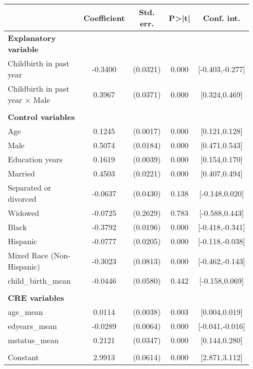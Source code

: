 {
\def\sym#1{\ifmmode^{#1}\else\(^{#1}\)\fi}
\begin{tabular}{l*{1}{cccc}}
\toprule
                    & Coefficient&   Std. err.&       P>|t|&  Conf. int.\\
\midrule
\textbf{Explanatory variable}&            &            &            &            \\
Childbirth in past year&     -0.3400&    (0.0321)&       0.000&[-0.403,-0.277]\\
Childbirth in past year $\times$ Male&      0.3967&    (0.0371)&       0.000&[0.324,0.469]\\
\\ \textbf{Control variables}&            &            &            &            \\
Age                 &      0.1245&    (0.0017)&       0.000&[0.121,0.128]\\
Male                &      0.5074&    (0.0184)&       0.000&[0.471,0.543]\\
Education years     &      0.1619&    (0.0039)&       0.000&[0.154,0.170]\\
Married             &      0.4503&    (0.0221)&       0.000&[0.407,0.494]\\
Separated or divorced&     -0.0637&    (0.0430)&       0.138&[-0.148,0.020]\\
Widowed             &     -0.0725&    (0.2629)&       0.783&[-0.588,0.443]\\
Black               &     -0.3792&    (0.0196)&       0.000&[-0.418,-0.341]\\
Hispanic            &     -0.0777&    (0.0205)&       0.000&[-0.118,-0.038]\\
Mixed Race (Non-Hispanic)&     -0.3023&    (0.0813)&       0.000&[-0.462,-0.143]\\
child\_birth\_mean    &     -0.0446&    (0.0580)&       0.442&[-0.158,0.069]\\
\\ \textbf{CRE variables}&            &            &            &            \\
age\_mean            &      0.0114&    (0.0038)&       0.003&[0.004,0.019]\\
edyears\_mean        &     -0.0289&    (0.0064)&       0.000&[-0.041,-0.016]\\
mstatus\_mean        &      0.2121&    (0.0347)&       0.000&[0.144,0.280]\\
                    &            &            &            &            \\
Constant            &      2.9913&    (0.0614)&       0.000&[2.871,3.112]\\

\end{tabular}}
